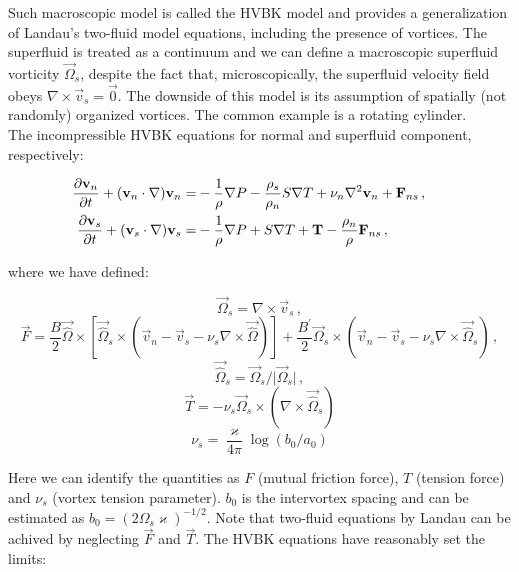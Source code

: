 Such macroscopic model is called the HVBK model and provides a generalization of Landau's two-fluid model equations, including the presence of vortices. The superfluid is treated as a continuum and we can define a macroscopic superfluid vorticity $\vec{\Omega}_s$, despite the fact that, microscopically, the superfluid velocity field obeys $\nabla \times \vec{v}_s = \vec{0}$. The downside of this model is its assumption of spatially (not randomly) organized vortices. The common example is a rotating cylinder.\\
The incompressible HVBK equations for normal and superfluid component, respectively:

\begin{align}
\frac{\partial\vec{v}_n}{\partial t} + (\vec{v}_n\cdot \nabla)\vec{v}_n =& -\frac{1}{\rho} \nabla P - \frac{\rho_s}{\rho_n} S \nabla T + \nu_n \nabla^2 \vec{v}_n + \vec{F}_{ns}\,,
\label{motion_normal}\\
\frac{\partial\vec{v}_s}{\partial t} + (\vec{v}_s\cdot \nabla)\vec{v}_s =& -\frac{1}{\rho} \nabla P + S \nabla T + \vec{T} - \frac{\rho_n}{\rho} \vec{F}_{ns}\,,
\hspace{15mm}
\label{motion_super}
\end{align}

where we have defined:

\begin{equation}
\vec{\Omega}_s = \nabla \times \vec{v}_s\,,
\end{equation}
\begin{equation}
\vec{F} = \frac{B}{2} \vec{\hat{\Omega}} \times [\vec{\hat{\Omega}}_s \times (\vec{v}_n - \vec{v}_s - \nu_s\nabla \times \vec{\hat{\Omega}})]
+ \frac{B^{\prime}}{2} \vec{\Omega}_s \times (\vec{v}_n - \vec{v}_s - \nu_s\nabla \times \vec{\hat{\Omega}}_s)\,,
\end{equation}
\begin{equation}
\vec{\hat{\Omega}}_s = \vec{\Omega}_s / \vert \vec{\Omega}_s \vert\,,
\end{equation}
\begin{equation}
\vec{T} = -\nu_s \vec{\Omega}_s \times (\nabla \times \vec{\hat{\Omega}}_s)
\end{equation}
\begin{equation}
\nu_s = \frac{\varkappa}{4\pi} \log(b_0 / a_0)
\end{equation}

Here we can identify the quantities as $F$ (mutual friction force), $T$ (tension force) and $\nu_s$ (vortex tension parameter). $b_0$ is the intervortex spacing and can be estimated as $b_0 = (2\Omega_s \varkappa)^{-1/2}$. Note that two-fluid equations by Landau can be achived by neglecting $\vec{F}$ and $\vec{T}$. The HVBK equations have reasonably set the limits:

